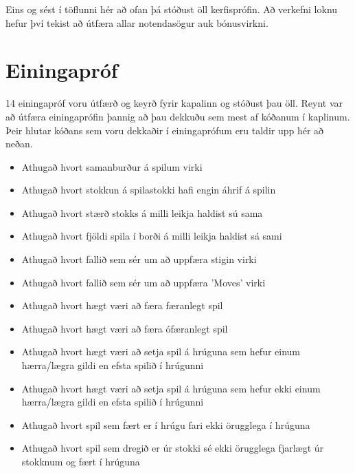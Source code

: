 \documentclass[11pt,a4paper,titlepage]{article}
\theoremstyle{plain}
\theoremstyle{remark}
\begin{document}
Eins og sést í töflunni hér að ofan þá stóðust öll kerfisprófin. Að verkefni loknu hefur því tekist að útfæra allar notendasögur auk bónusvirkni.

\section{Einingapróf}

14 einingapróf voru útfærð og keyrð fyrir kapalinn og stóðust þau öll. Reynt var að útfæra einingaprófin þannig að þau dekkuðu sem mest af kóðanum í kaplinum. Þeir hlutar kóðans sem voru dekkaðir í einingaprófum eru taldir upp hér að neðan.

\begin{itemize}
\item Athugað hvort samanburður á spilum virki
\item Athugað hvort stokkun á spilastokki hafi engin áhrif á spilin
\item Athugað hvort stærð stokks á milli leikja haldist sú sama
\item Athugað hvort fjöldi spila í borði á milli leikja haldist sá sami
\item Athugað hvort fallið sem sér um að uppfæra stigin virki
\item Athugað hvort fallið sem sér um að uppfæra 'Moves' virki
\item Athugað hvort hægt væri að færa færanlegt spil
\item Athugað hvort hægt væri að færa ófæranlegt spil
\item Athugað hvort hægt væri að setja spil á hrúguna sem hefur einum hærra/lægra gildi en efsta spilið í hrúgunni
\item Athugað hvort hægt væri að setja spil á hrúguna sem hefur ekki einum hærra/lægra gildi en efsta spilið í hrúgunni
\item Athugað hvort spil sem fært er í hrúgu fari ekki örugglega í hrúguna
\item Athugað hvort spil sem dregið er úr stokki sé ekki örugglega fjarlægt úr stokknum og fært í hrúguna
\end{itemize}


	
\end{document}
